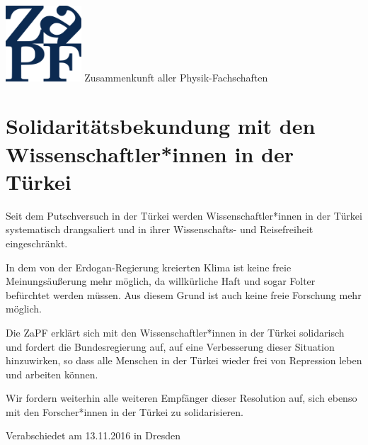 \documentclass[DIV=calc]{scrartcl}
\begin{document}
\hspace{0.87\textwidth}
\begin{minipage}{120pt}
\vspace{-1.8cm}
\includegraphics[width=80pt]{logo.pdf}
\centering
\small Zusammenkunft aller Physik-Fachschaften
\end{minipage}
\begin{center}
\normalsize
\end{center}

\vspace{1cm}
\section*{Solidaritätsbekundung mit den Wissenschaftler*innen in der Türkei}

Seit dem Putschversuch in der Türkei werden Wissenschaftler*innen in der Türkei
systematisch drangsaliert und in ihrer Wissenschafts- und Reisefreiheit
eingeschränkt.

In dem von der Erdogan-Regierung kreierten Klima ist keine freie Meinungsäußerung
mehr möglich, da willkürliche Haft und sogar Folter befürchtet werden
müssen. Aus diesem Grund ist auch keine freie Forschung mehr möglich.

Die ZaPF erklärt sich mit den Wissenschaftler*innen in der Türkei solidarisch und
fordert die Bundesregierung auf, auf eine Verbesserung dieser Situation
hinzuwirken, so dass alle Menschen in der Türkei wieder frei von Repression
leben und arbeiten können.

Wir fordern weiterhin alle weiteren Empfänger dieser Resolution auf, sich ebenso
mit den Forscher*innen in der Türkei zu solidarisieren.
\vfill
\begin{flushright}
Verabschiedet am 13.11.2016 in Dresden
\end{flushright}
\end{document}
